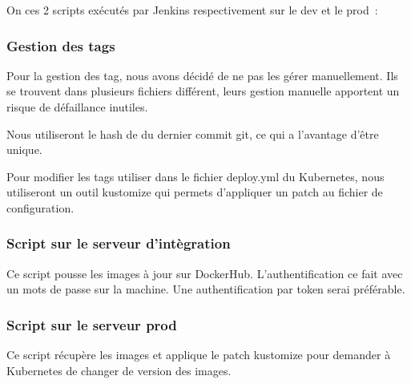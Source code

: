 On ces 2 scripts exécutés par Jenkins respectivement sur le dev et le prod~:





\subsubsection{Gestion des tags}
Pour la gestion des tag, nous avons décidé de ne pas les gérer manuellement.
Ils se trouvent dans plusieurs fichiers différent, leurs gestion manuelle apportent un risque de défaillance inutiles.

Nous utiliseront le hash de du dernier commit git,  ce qui a l'avantage d’être unique.

Pour modifier les tags utiliser dans le fichier deploy.yml du Kubernetes,
nous utiliseront un outil kustomize qui permets d'appliquer un patch au fichier de configuration.



\subsubsection{Script sur le serveur d'intègration}
Ce script pousse les images à jour sur DockerHub.
L'authentification ce fait avec un mots de passe sur la machine.
Une authentification par token serai préférable.



\subsubsection{Script sur le serveur prod}
Ce script récupère les images et applique le patch kustomize pour demander à Kubernetes de changer de version des images.



